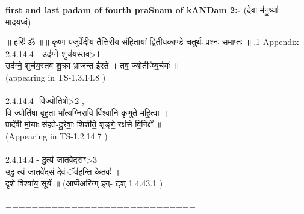 \documentclass[17pt]{extarticle}
\begin{document}
\textbf{first and last padam of fourth praSnam of kANDam 2:-} \newline
(दे॒वा म॑नु॒ष्या॑ - मादयध्वं) \newline 


॥ हरिः॑ ॐ ॥॥ कृष्ण यजुर्वेदीय तैत्तिरीय संहितायां द्वितीयकाण्डे चतुर्थः प्रश्नः समाप्तः ॥ \newline
{}.1   Appendix\\2.4.14.4 - उद॑ग्ने शुच॑य॒स्तव॒>1\\उद॑ग्ने॒ शुच॑य॒स्तव॑ शु॒क्रा भ्राज॑न्त ईरते । तव॒ ज्योतीꣳ॑ष्य॒र्चयः॑ ॥ \\(appearing in TS-1.3.14.8 )\\\\2.4.14.4- विज्योति॒षो>2 ,\\वि ज्योति॑षा बृह॒ता भा᳚त्य॒ग्निरा॒वि र्विश्वा॑नि कृणुते महि॒त्वा ।\\प्रादे॑वी र्मा॒याः स॑हते-दु॒रेवाः॒ शिशी॑ते॒ शृङ्गे॒ रक्ष॑से वि॒निक्षे᳚ ॥\\(Appearing in TS-1.2.14.7 )\\\\2.4.14.4 - दु॒त्यं जा॒तवे॑दसꣳ>3\\उदु॒ त्यं जा॒तवे॑दसं दे॒वं ॅव॑हन्ति के॒तवः॑ । \\दृ॒शे विश्वा॑य॒ सूर्यं᳚ ॥ (आप्पॆअरिन्ग् इन्- ट्श् 1.4.43.1 )\\\\=============================\\
\pagebreak
        
\end{document}
